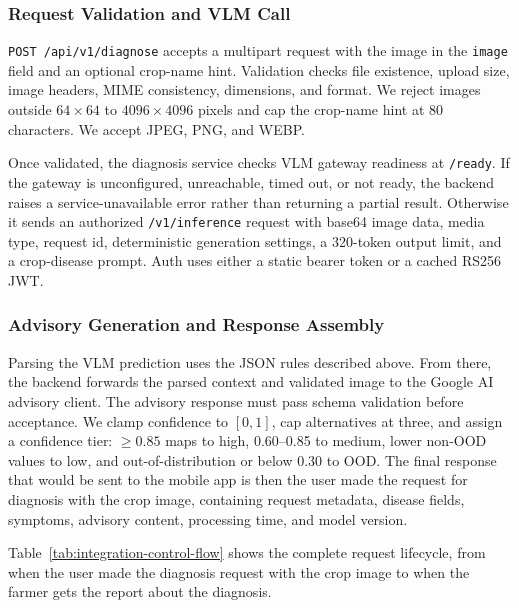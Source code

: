 
\subsubsection{Request Validation and VLM Call}

\texttt{POST /api/v1/diagnose} accepts a multipart request with the image in the
\texttt{image} field and an optional crop-name hint. Validation checks file existence, upload
size, image headers, MIME consistency, dimensions, and format. We reject images outside
\(64 \times 64\) to \(4096 \times 4096\) pixels and cap the crop-name hint at
80 characters. We accept JPEG, PNG, and WEBP.

Once validated, the diagnosis service checks VLM gateway readiness at \texttt{/ready}. If the
gateway is unconfigured, unreachable, timed out, or not ready, the backend raises a
service-unavailable error rather than returning a partial result. Otherwise it sends an
authorized \texttt{/v1/inference} request with base64 image data, media type, request id,
deterministic generation settings, a 320-token output limit, and a crop-disease prompt.
Auth uses either a static bearer token or a cached RS256 JWT.

\subsubsection{Advisory Generation and Response Assembly}

Parsing the VLM prediction uses the JSON rules described above. From there, the backend
forwards the parsed context and validated image to the Google AI advisory client. The advisory
response must pass schema validation before acceptance. We clamp confidence to \([0, 1]\),
cap alternatives at three, and assign a confidence tier: \(\geq 0.85\) maps to high, 0.60--0.85
to medium, lower non-OOD values to low, and out-of-distribution or below 0.30 to OOD. The final response that would be sent to the mobile app is then the user made the request for diagnosis with the crop image, containing request metadata, disease fields, symptoms, advisory content, processing time, and model version.


Table~\ref{tab:integration-control-flow} shows the complete request lifecycle, from when the user made the diagnosis request with the crop image to when the farmer gets the report about the diagnosis.

